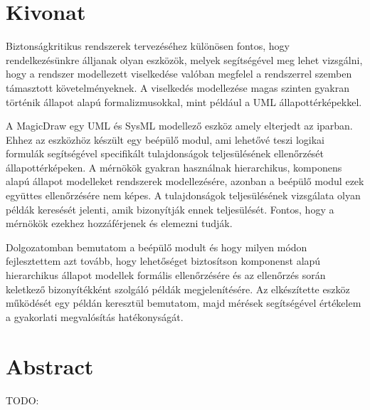 \setcounter{page}{1}

\selecthungarian

\chapter*{Kivonat}


Biztonságkritikus rendszerek tervezéséhez különösen fontos, hogy rendelkezésünkre álljanak olyan eszközök, melyek segítségével meg lehet vizsgálni, hogy a rendszer modellezett viselkedése valóban megfelel a rendszerrel szemben támasztott követelményeknek. A viselkedés modellezése magas szinten gyakran történik állapot alapú formalizmusokkal, mint például a UML állapottérképekkel.

A MagicDraw egy UML és SysML modellező eszköz amely elterjedt az iparban. Ehhez az eszközhöz készült egy beépülő modul, ami lehetővé teszi logikai formulák segítségével specifikált tulajdonságok teljesülésének ellenőrzését állapottérképeken. A mérnökök gyakran használnak hierarchikus, komponens alapú állapot modelleket rendszerek modellezésére, azonban a beépülő modul ezek együttes ellenőrzésére nem képes. A tulajdonságok teljesülésének vizsgálata olyan példák keresését jelenti, amik bizonyítják ennek teljesülését. Fontos, hogy a mérnökök ezekhez hozzáférjenek és elemezni tudják. 

Dolgozatomban bemutatom a beépülő modult és hogy milyen módon fejlesztettem azt tovább, hogy lehetőséget biztosítson komponenst alapú hierarchikus állapot modellek formális ellenőrzésére és az ellenőrzés során keletkező bizonyítékként szolgáló példák megjelenítésére. Az elkészítette eszköz működését egy példán keresztül bemutatom, majd mérések segítségével értékelem a gyakorlati megvalósítás hatékonyságát.


\vfill
\selectenglish


\chapter*{Abstract}

TODO:

\vfill
\cleardoublepage

\selectthesislanguage

\setcounter{romanPage}{\value{page}}
